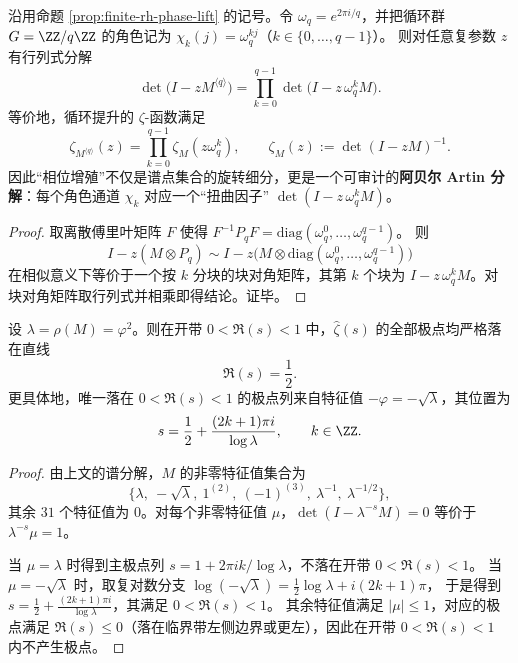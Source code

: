 \begin{proposition}\label{prop:finite-rh-phase-lift-artin}
沿用命题 \ref{prop:finite-rh-phase-lift} 的记号。令
\(
\omega_q=e^{2\pi i/q}
\)，并把循环群 \(G=\ZZ/q\ZZ\) 的角色记为 \(\chi_k(j)=\omega_q^{kj}\)（\(k\in\{0,\dots,q-1\}\)）。
则对任意复参数 \(z\) 有行列式分解
\[
\det\!\bigl(I-zM^{\langle q\rangle}\bigr)
=\prod_{k=0}^{q-1}\det\!\bigl(I-z\,\omega_q^k M\bigr).
\]
等价地，循环提升的 \(\zeta\)-函数满足
\[
\zeta_{M^{\langle q\rangle}}(z)
=\prod_{k=0}^{q-1}\zeta_{M}(z\omega_q^k),
\qquad
\zeta_M(z):=\det(I-zM)^{-1}.
\]
因此“相位增殖”不仅是谱点集合的旋转细分，更是一个可审计的\textbf{阿贝尔 Artin 分解}：每个角色通道 \(\chi_k\) 对应一个“扭曲因子” \(\det(I-z\,\omega_q^k M)\)。
\end{proposition}

\begin{proof}
取离散傅里叶矩阵 \(F\) 使得 \(F^{-1}P_qF=\mathrm{diag}(\omega_q^0,\dots,\omega_q^{q-1})\)。
则
\[
I-z(M\otimes P_q)
\sim
I-z\bigl(M\otimes \mathrm{diag}(\omega_q^0,\dots,\omega_q^{q-1})\bigr)
\]
在相似意义下等价于一个按 \(k\) 分块的块对角矩阵，其第 \(k\) 个块为 \(I-z\,\omega_q^k M\)。对块对角矩阵取行列式并相乘即得结论。证毕。
\end{proof}

\begin{proposition}[临界带中的非平凡极点都在 \texorpdfstring{$\Re(s)=\tfrac12$}{Re(s)=1/2}]\label{prop:finite-rh-40}
设 $\lambda=\rho(M)=\varphi^2$。则在开带 $0<\Re(s)<1$ 中，$\widehat{\zeta}(s)$ 的全部极点均严格落在直线
\[
\Re(s)=\frac12.
\]
更具体地，唯一落在 $0<\Re(s)<1$ 的极点列来自特征值 $-\varphi=-\sqrt{\lambda}$，其位置为
\[
s=\frac12+\frac{(2k+1)\pi i}{\log\lambda},\qquad k\in\ZZ.
\]
\end{proposition}

\begin{proof}
由上文的谱分解，$M$ 的非零特征值集合为
\[
\{\lambda,\ -\sqrt{\lambda},\ 1^{(2)},\ (-1)^{(3)},\ \lambda^{-1},\ \lambda^{-1/2}\},
\]
其余 $31$ 个特征值为 $0$。对每个非零特征值 $\mu$，$\det(I-\lambda^{-s}M)=0$ 等价于 $\lambda^{-s}\mu=1$。

当 $\mu=\lambda$ 时得到主极点列 $s=1+2\pi i k/\log\lambda$，不落在开带 $0<\Re(s)<1$。
当 $\mu=-\sqrt{\lambda}$ 时，取复对数分支 $\log(-\sqrt{\lambda})=\tfrac12\log\lambda+i(2k+1)\pi$，
于是得到
\(
s=\tfrac12+\frac{(2k+1)\pi i}{\log\lambda}
\)，其满足 $0<\Re(s)<1$。
其余特征值满足 $|\mu|\le 1$，对应的极点满足 $\Re(s)\le 0$（落在临界带左侧边界或更左），因此在开带 $0<\Re(s)<1$ 内不产生极点。
\end{proof}

